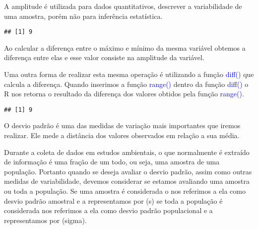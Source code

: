 \documentclass[titlepage, oneside, openany, a4paper]{book}
\newenvironment{Shaded}{\begin{snugshade}}{\end{snugshade}}
\newcommand{\KeywordTok}[1]{\textcolor[rgb]{0.13,0.29,0.53}{\textbf{#1}}}
\newcommand{\NormalTok}[1]{#1}
\newcommand{\OperatorTok}[1]{\textcolor[rgb]{0.81,0.36,0.00}{\textbf{#1}}}
\newcommand{\StringTok}[1]{\textcolor[rgb]{0.31,0.60,0.02}{#1}}
\begin{document}
A amplitude é utilizada para dados quantitativos, descrever a variabilidade de uma amostra, porém não para inferência estatística.

\begin{Shaded}
\end{Shaded}

\begin{verbatim}
## [1] 9
\end{verbatim}

Ao calcular a diferença entre o máximo e mínimo da mesma variável obtemos a diferença entre elas e esse valor consiste na amplitude da variável.

Uma outra forma de realizar esta mesma operação é utilizando a função \textcolor{blue}{diff()} que calcula a diferença. Quando inserimos a função \textcolor{blue}{range()} dentro da função \textcolor{blue}{diff()} o R nos retorna o resultado da diferença dos valores obtidos pela função \textcolor{blue}{range()}.

\begin{Shaded}
\end{Shaded}

\begin{verbatim}
## [1] 9
\end{verbatim}

O desvio padrão é uma das medidas de variação mais importantes que iremos realizar. Ele mede a distância dos valores observados em relação a sua média.

Durante a coleta de dados em estudos ambientais, o que normalmente é extraído de informação é uma fração de um todo, ou seja, uma amostra de uma população. Portanto quando se deseja avaliar o desvio padrão, assim como outras medidas de variabilidade, devemos considerar se estamos avaliando uma amostra ou toda a população. Se uma amostra é considerada o nos referimos a ela como desvio padrão amostral e a representamos por (s) se toda a população é considerada nos referimos a ela como desvio padrão populacional e a representamos por (sigma).
\end{document}
